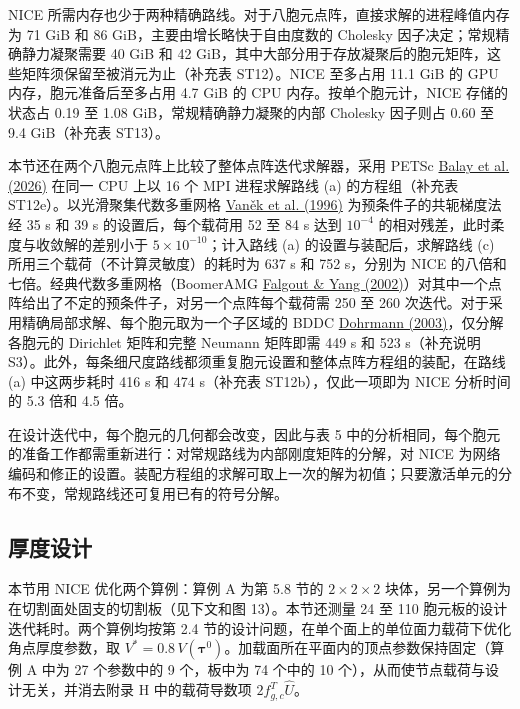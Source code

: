 \documentclass[preprint,12pt,authoryear]{elsarticle}
\begin{document}
NICE 所需内存也少于两种精确路线。对于八胞元点阵，直接求解的进程峰值内存为 71 GiB 和 86 GiB，主要由增长略快于自由度数的 Cholesky 因子决定；常规精确静力凝聚需要 40 GiB 和 42 GiB，其中大部分用于存放凝聚后的胞元矩阵，这些矩阵须保留至被消元为止（补充表 ST12）。NICE 至多占用 11.1 GiB 的 GPU 内存，胞元准备后至多占用 4.7 GiB 的 CPU 内存。按单个胞元计，NICE 存储的状态占 0.19 至 1.08 GiB，常规精确静力凝聚的内部 Cholesky 因子则占 0.60 至 9.4 GiB（补充表 ST13）。

本节还在两个八胞元点阵上比较了整体点阵迭代求解器，采用 PETSc \href{https://petsc.org/release/manual/}{Balay et al. (2026)} 在同一 CPU 上以 16 个 MPI 进程求解路线 (a) 的方程组（补充表 ST12e）。以光滑聚集代数多重网格 \href{https://doi.org/10.1007/BF02238511}{Vaněk et al. (1996)} 为预条件子的共轭梯度法经 35 s 和 39 s 的设置后，每个载荷用 52 至 84 s 达到 \(10^{-4}\) 的相对残差，此时柔度与收敛解的差别小于 \(5\times10^{-10}\)；计入路线 (a) 的设置与装配后，求解路线 (c) 所用三个载荷（不计算灵敏度）的耗时为 637 s 和 752 s，分别为 NICE 的八倍和七倍。经典代数多重网格（BoomerAMG \href{https://doi.org/10.1007/3-540-47789-6_66}{Falgout \& Yang (2002)}）对其中一个点阵给出了不定的预条件子，对另一个点阵每个载荷需 250 至 260 次迭代。对于采用精确局部求解、每个胞元取为一个子区域的 BDDC \href{https://doi.org/10.1137/S1064827502412887}{Dohrmann (2003)}，仅分解各胞元的 Dirichlet 矩阵和完整 Neumann 矩阵即需 449 s 和 523 s（补充说明 S3）。此外，每条细尺度路线都须重复胞元设置和整体点阵方程组的装配，在路线 (a) 中这两步耗时 416 s 和 474 s（补充表 ST12b），仅此一项即为 NICE 分析时间的 5.3 倍和 4.5 倍。

在设计迭代中，每个胞元的几何都会改变，因此与表 5 中的分析相同，每个胞元的准备工作都需重新进行：对常规路线为内部刚度矩阵的分解，对 NICE 为网络编码和修正的设置。装配方程组的求解可取上一次的解为初值；只要激活单元的分布不变，常规路线还可复用已有的符号分解。

\subsection{厚度设计}

本节用 NICE 优化两个算例：算例 A 为第 5.8 节的 \(2\times2\times2\) 块体，另一个算例为在切割面处固支的切割板（见下文和图 13）。本节还测量 24 至 110 胞元板的设计迭代耗时。两个算例均按第 2.4 节的设计问题，在单个面上的单位面力载荷下优化角点厚度参数，取 \(V^*=0.8\,V(\boldsymbol\tau^0)\)。加载面所在平面内的顶点参数保持固定（算例 A 中为 27 个参数中的 9 个，板中为 74 个中的 10 个），从而使节点载荷与设计无关，并消去附录 H 中的载荷导数项 \(2f_{g,c}^T\widehat U\)。
\end{document}
